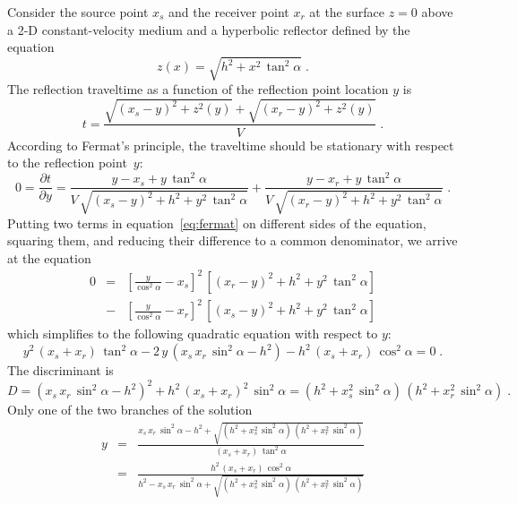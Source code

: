Consider the source point $x_s$ and the receiver point $x_r$ at the
surface $z=0$ above a 2-D constant-velocity medium and a hyperbolic
reflector  defined by the equation 
\begin{equation}
  \label{eq:hypref}
  z(x) = \sqrt{h^2 +
    x^2\,\tan^2{\alpha}}\;.
\end{equation}
The reflection traveltime as a function of the reflection point
location $y$ is
\begin{equation}
  \label{eq:tofy}
  t = \frac{\sqrt{(x_s-y)^2 + z^2(y)} + \sqrt{(x_r-y)^2+z^2(y)}}{V}\;.
\end{equation}
According to Fermat's principle, the traveltime should be stationary
with respect to the reflection point~$y$:
\begin{equation}
\label{eq:fermat}
0 = \frac{\partial t}{\partial y} =
\frac{y-x_s + y\,\tan^2{\alpha}}{V\,\sqrt{(x_s-y)^2 + h^2 + y^2\,\tan^2{\alpha}}} +
\frac{y-x_r + y\,\tan^2{\alpha}}{V\,\sqrt{(x_r-y)^2 + h^2 + y^2\,\tan^2{\alpha}}}\;.
\end{equation}
Putting two terms in equation~\ref{eq:fermat} on different sides of
the equation, squaring them, and reducing their difference to a common
denominator, we arrive at the equation
\begin{eqnarray}
\nonumber
0 & = & 
\left[\frac{y}{\cos^2{\alpha}} - x_s\right]^2\,\left[(x_r-y)^2 + h^2 + y^2\,\tan^2{\alpha}\right] \\
& - & 
\left[\frac{y}{\cos^2{\alpha}} - x_r\right]^2\,\left[(x_s-y)^2 + h^2 + y^2\,\tan^2{\alpha}\right] 
\label{eq:fermat2}
\end{eqnarray}
which simplifies to the following quadratic equation with respect to $y$:
\begin{equation}
  \label{eq:y2}
  y^2\,(x_s+x_r)\,\tan^2{\alpha} - 2\,y\,\left(x_s\,x_r\,\sin^2{\alpha} - h^2\right) -
  h^2\,(x_s+x_r)\,\cos^2{\alpha} = 0\;.
\end{equation}
The discriminant is
\begin{equation}
  \label{eq:disc}
  D = \left(x_s\,x_r\,\sin^2{\alpha}-h^2\right)^2 + h^2\,(x_s+x_r)^2\,\sin^2{\alpha}
  = (h^2+x_s^2\,\sin^2{\alpha})\,(h^2+x_r^2\,\sin^2{\alpha})\;.
\end{equation}
Only one of the two branches of the solution
\begin{eqnarray}
  \nonumber
  y & = & 
  \frac{x_s\,x_r\,\sin^2{\alpha}-h^2 + \sqrt{(h^2+x_s^2\,\sin^2{\alpha})\,(h^2+x_r^2\,\sin^2{\alpha})}}{(x_s+x_r)\,\tan^2{\alpha}} \\
  & = &
  \frac{h^2\,(x_s+x_r)\,\cos^2{\alpha}}{h^2 - x_s\,x_r\,\sin^2{\alpha} +
    \sqrt{(h^2+x_s^2\,\sin^2{\alpha})\,(h^2+x_r^2\,\sin^2{\alpha})}}
  \label{eq:ys}
\end{eqnarray}
